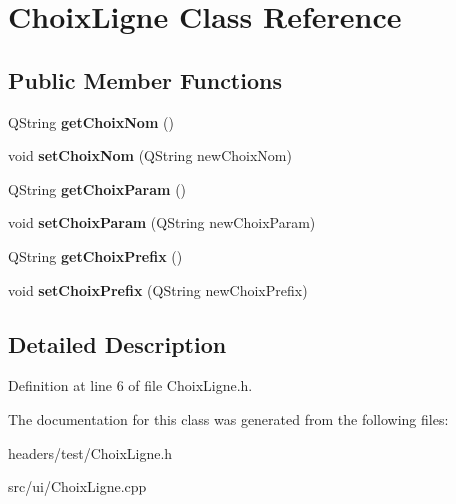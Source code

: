 \hypertarget{classChoixLigne}{\section{Choix\+Ligne Class Reference}
\label{classChoixLigne}
}
\subsection*{Public Member Functions}
\begin{DoxyCompactItemize}
\item 
\hypertarget{classChoixLigne_abdf282f67694452f4381f025b97c7bca}{Q\+String {\bfseries get\+Choix\+Nom} ()}\label{classChoixLigne_abdf282f67694452f4381f025b97c7bca}

\item 
\hypertarget{classChoixLigne_a29c424c6c3b527ac5ed1c6b037255238}{void {\bfseries set\+Choix\+Nom} (Q\+String new\+Choix\+Nom)}\label{classChoixLigne_a29c424c6c3b527ac5ed1c6b037255238}

\item 
\hypertarget{classChoixLigne_af07e6270bd35ba0d47232df004e1959e}{Q\+String {\bfseries get\+Choix\+Param} ()}\label{classChoixLigne_af07e6270bd35ba0d47232df004e1959e}

\item 
\hypertarget{classChoixLigne_a16a376319258f72bb4d72c49f6af073e}{void {\bfseries set\+Choix\+Param} (Q\+String new\+Choix\+Param)}\label{classChoixLigne_a16a376319258f72bb4d72c49f6af073e}

\item 
\hypertarget{classChoixLigne_a7e3802f6cd05adb6b77a71eb7a265e38}{Q\+String {\bfseries get\+Choix\+Prefix} ()}\label{classChoixLigne_a7e3802f6cd05adb6b77a71eb7a265e38}

\item 
\hypertarget{classChoixLigne_adece79d84d7e2b92fb2f8bbfb5abab33}{void {\bfseries set\+Choix\+Prefix} (Q\+String new\+Choix\+Prefix)}\label{classChoixLigne_adece79d84d7e2b92fb2f8bbfb5abab33}

\end{DoxyCompactItemize}


\subsection{Detailed Description}


Definition at line 6 of file Choix\+Ligne.\+h.



The documentation for this class was generated from the following files\+:\begin{DoxyCompactItemize}
\item 
headers/test/Choix\+Ligne.\+h\item 
src/ui/Choix\+Ligne.\+cpp\end{DoxyCompactItemize}
